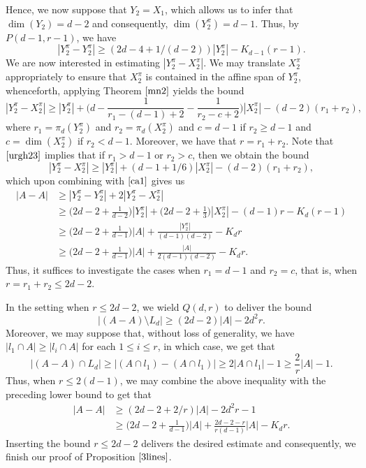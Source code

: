 Hence, we now suppose that $Y_2 = X_1$, which allows us to infer that $\dim(Y_2) = d-2$ and consequently, $\dim(Y_2^{\pi}) = d-1$. Thus, by $P(d-1,r-1)$, we have
\begin{equation} \label{ca1}
 |Y_2^{\pi} - Y_2^{\pi}| \geq (2d - 4 + 1/{(d-2)})|Y_2^{\pi}| - K_{d-1} (r-1).
 \end{equation}
We are now interested in estimating $|Y_2^{\pi} - X_2^{\pi}|$. We may translate $X_2^{\pi}$ appropriately to ensure that $X_2^{\pi}$ is contained in the affine span of $Y_2^{\pi}$, whenceforth, applying Theorem $\ref{mn2}$ yields the bound
\begin{equation} \label{urgh23}
 |Y_2^{\pi} - X_2^{\pi}| \geq |Y_2^{\pi}|  + \bigg(d - \frac{1}{r_1 -(d-1) +2} - \frac{1}{r_2 - c + 2}\bigg)|X_2^{\pi}|  - (d-2)(r_1 + r_2), 
 \end{equation}
where $r_1 = \pi_{d}(Y_2^{\pi})$ and $r_2 = \pi_{d}(X_2^{\pi})$ and $c = d-1$ if $r_2 \geq d-1$ and $c=\dim(X_2^{\pi})$ if $r_2 < d-1$. Moreover, we have that $r= r_1 + r_2$. Note that $\eqref{urgh23}$ implies that if $r_1 > d-1$ or $r_2 > c$, then we obtain the bound
\[ |Y_2^{\pi} - X_2^{\pi}| \geq |Y_2^{\pi}|  +  (d-1 + 1/6  )|X_2^{\pi}|  - (d-2)(r_1 + r_2) , \]
which upon combining with $\eqref{ca1}$ gives us
\begin{align*}
|A-A| & \geq  |Y_2^{\pi} - Y_2^{\pi}|  + 2 |Y_2^{\pi} - X_2^{\pi}| \\
& \geq \bigg(2d - 2 + \frac{1}{d-2}\bigg)|Y_2^{\pi}| + \bigg(2d -2 + \frac{1}{3} \bigg)|X_2^{\pi}|  - (d-1)r - K_d (r-1) \\
& \geq \bigg(2d - 2 + \frac{1}{d-1}\bigg)|A| + \frac{|Y_2^{\pi}|}{(d-1)(d-2)} - K_d r \\
& \geq  \bigg(2d - 2 + \frac{1}{d-1}\bigg)|A| + \frac{|A|}{2(d-1)(d-2)} - K_d r .
\end{align*}
Thus, it suffices to investigate the cases when $r_1 = d-1$ and $r_2 = c$, that is, when $r = r_1 + r_2 \leq 2d-2$. 
\par

In the setting when $r \leq 2d-2$, we wield $Q(d,r)$ to deliver the bound
\[ |(A-A) \setminus L_d| \geq (2d-2) |A| - 2d^2 r. \]
Moreover,  we may suppose that, without loss of generality, we have $|l_1 \cap A| \geq |l_i \cap A|$ for each $1 \leq i \leq r$, in which case, we get that
\[ |(A-A) \cap L_d| \geq |(A \cap l_1) - (A \cap l_1)| \geq 2 |A \cap l_1| -1 \geq \frac{2}{r} |A| - 1. \]
Thus, when $r \leq 2(d-1)$, we may combine the above inequality with the preceding lower bound to get that
\begin{align*}
 |A-A| & \geq (2d - 2+ 2/r) |A| - 2d^2r - 1 \\
 & \geq \bigg(2d - 2 + \frac{1}{d-1}\bigg) |A| + \frac{2d-2 - r}{r(d-1)} |A| - K_d r . 
 \end{align*}
Inserting the bound $r \leq 2d-2$ delivers the desired estimate and consequently, we finish our proof of Proposition $\ref{3lines}$. 
\par

